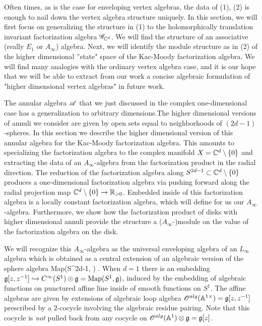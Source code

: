 \documentclass[10pt]{amsart}
\begin{document}
Often times, as is the case for enveloping vertex algebras, the data of (1), (2) is enough to nail down the vertex algebra structure uniquely. 
In this section, we will first focus on generalizing the structure in (1) to the holomorphically translation invariant factorization algebra $\mathscr G_{\mathbb C^d}$.
We will find the structure of an associative (really $E_1$ or $A_\infty$) algebra.
Next, we will identify the module structure as in (2) of the higher dimensional ''state" space of the Kac-Moody factorization algebra.
We will find many analogies with the ordinary vertex algebra case, and it is our hope that we will be able to extract from our work a concise algebraic formulation of "higher dimensional vertex algebras" in future work.

The annular algebra $\mathscr A$ that we just discussed in the complex one-dimensional case has a generalization to arbitrary dimensions.The higher dimensional versions of annuli we consider are given by open sets equal to neighborhoods of $(2d-1)$-spheres.
In this section we describe the higher dimensional version of this annular algebra for the Kac-Moody factorization algebra.
This amounts to specializing the factorization algebra to the complex manifold $X = \mathbb C^d \setminus \{0\}$ and extracting the data of an $A_\infty$-algebra from the factorization product in the radial direction.
The reduction of the factorization algebra along $S^{2d-1} \subset \mathbb C^d \setminus \{0\}$ produces a one-dimensional factorization algebra via pushing forward along the radial projection map $\mathbb C^d \setminus \{0\} \to \mathbb R_{>0}$.
Embedded inside of this factorization algebra is a locally constant factorization algebra, which will define for us our $A_\infty$-algebra.
Furthermore, we show how the factorization product of disks with higher dimensional annuli provide the structure a ($A_\infty$-)module on the value of the factorization algebra on the disk.

We will recognize this $A_\infty$-algebra as the universal enveloping algebra of an $L_\infty$ algebra which is obtained as a central extension of an algebraic version of the sphere algebra
\beqn\label{mapping space}
{\rm Map}(S^{2d-1}, \fg) .
\eeqn
When $d=1$ there is an embedding $\mathfrak g[z,z^{-1}] \hookrightarrow C^\infty(S^1) \otimes \mathfrak g = {\rm Map}(S^1, \mathfrak g)$, induced by the embedding of algebraic functions on punctured affine line inside of smooth functions on $S^1$. 
The affine algebras are given by extensions of algebraic loop algebra $\mathscr O^{alg}(\mathbb A^{1\times}) = \mathfrak g[z,z^{-1}]$ prescribed by a $2$-cocycle involving the algebraic residue pairing. 
Note that this cocycle is {\em not} pulled back from any cocycle on $\mathscr O^{alg}(\mathbb A^1) \otimes \mathfrak g = \mathfrak g[z]$. 
\end{document}
